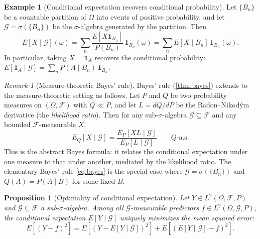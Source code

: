 \documentclass[12pt]{amsart}
\newtheorem{proposition}[theorem]{Proposition}
\theoremstyle{definition}
\newtheorem{example}[theorem]{Example}
\theoremstyle{remark}
\newtheorem*{remark}{Remark}
\newcommand{\cF}{\mathcal{F}}
\begin{document}
\begin{example}[Conditional expectation recovers conditional probability]\label{ex:cond-exp-partition}
Let $\{B_n\}$ be a countable partition of $\Omega$ into events of positive probability, and let $\mathcal{G} = \sigma(\{B_n\})$ be the $\sigma$-algebra generated by the partition. Then
\[
E[X \mid \mathcal{G}](\omega) = \sum_n \frac{E[X \mathbf{1}_{B_n}]}{P(B_n)}\, \mathbf{1}_{B_n}(\omega) = \sum_n E[X \mid B_n]\, \mathbf{1}_{B_n}(\omega).
\]
In particular, taking $X = \mathbf{1}_A$ recovers the conditional probability: $E[\mathbf{1}_A \mid \mathcal{G}] = \sum_n P(A \mid B_n)\, \mathbf{1}_{B_n}$.
\end{example}

\begin{remark}[Measure-theoretic Bayes' rule]\label{rmk:bayes-measure}
Bayes' rule (\cref{thm:bayes}) extends to the measure-theoretic setting as follows. Let $P$ and $Q$ be two probability measures on $(\Omega, \cF)$ with $Q \ll P$, and let $L = dQ/dP$ be the Radon--Nikod\'ym derivative (the \emph{likelihood ratio}). Then for any sub-$\sigma$-algebra $\mathcal{G} \subseteq \cF$ and any bounded $\cF$-measurable $X$,
\begin{equation}\label{eq:abstract-bayes}
E_Q[X \mid \mathcal{G}] = \frac{E_P[XL \mid \mathcal{G}]}{E_P[L \mid \mathcal{G}]} \qquad Q\text{-a.s.}
\end{equation}
This is the abstract Bayes formula: it relates the conditional expectation under one measure to that under another, mediated by the likelihood ratio. The elementary Bayes' rule \eqref{eq:bayes} is the special case where $\mathcal{G} = \sigma(\{B_n\})$ and $Q(A) = P(A \mid B)$ for some fixed $B$.
\end{remark}

\begin{proposition}[Optimality of conditional expectation]\label{prop:cond-exp-optimal}
Let $Y \in L^2(\Omega, \cF, P)$ and $\mathcal{G} \subseteq \cF$ a sub-$\sigma$-algebra. Among all $\mathcal{G}$-measurable predictors $f \in L^2(\Omega, \mathcal{G}, P)$, the conditional expectation $E[Y \mid \mathcal{G}]$ uniquely minimizes the mean squared error:
\begin{equation}\label{eq:mse-decomp}
E[(Y - f)^2] = E[(Y - E[Y \mid \mathcal{G}])^2] + E[(E[Y \mid \mathcal{G}] - f)^2].
\end{equation}
\end{proposition}
\end{document}
